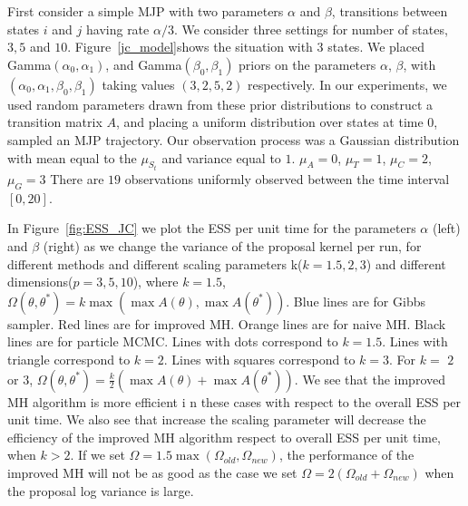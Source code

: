 \noindent First consider a simple MJP with two parameters $\alpha$ and $\beta$, transitions between states $i$ and $j$ having rate $\alpha /3 $.
We consider three settings for number of states, $3, 5$ and $10$.
Figure~\ref{jc_model}shows the situation with $3$ states.  
We placed Gamma$(\alpha_0,\alpha_1)$, and Gamma$(\beta_0, \beta_1)$ priors on the parameters $\alpha$, $\beta$, with $(\alpha_0,\alpha_1,\beta_0,\beta_1)$ taking
values $(3,2,5,2)$ respectively. In our experiments, we used random parameters drawn from these prior distributions to construct a transition matrix $A$,
and placing a uniform distribution over states at time $0$, sampled an MJP trajectory.
Our observation process was a Gaussian distribution with mean equal to the $\mu_{S_t}$ and variance equal to $1$. $\mu_A = 0$, $\mu_T = 1$, $\mu_C = 2$, $\mu_G = 3$  There are $19$ observations uniformly observed between the time interval $[0, 20]$.

  In Figure~\ref{fig:ESS_JC} we plot the ESS per unit time for the parameters $\alpha$ (left) and $\beta$ (right) as we change the variance of the
  proposal kernel per run, for different methods and different scaling parameters k($k = 1.5, 2, 3$) and different dimensions($p = 3, 5, 10$), where   $k = 1.5$,  $\Omega(\theta, \theta^*) = k \max(\max A(\theta), \max A(\theta^*))$. Blue lines are for Gibbs sampler. Red lines are for improved MH. Orange lines are for naive MH. Black lines are for particle MCMC. Lines with dots correspond to $k = 1.5$. Lines with triangle correspond to $k = 2$. Lines with squares correspond to $k = 3$. For $k=$ $2$ or $3$, $\Omega(\theta, \theta^*) = \frac{k}{2} (\max A(\theta) + \max A(\theta^*))$. We see that the improved MH algorithm is more efficient i	n these cases with respect to the overall ESS per unit time. We also see that increase the scaling parameter will decrease the efficiency of the improved MH algorithm respect to overall ESS per unit time, when $k > 2$. If we set $\Omega = 1.5 \max(\Omega_{old}, \Omega_{new})$, the performance of the improved MH will not be as good as the case we set $\Omega = 2(\Omega_{old} + \Omega_{new})$ when the proposal log variance is large.\\


